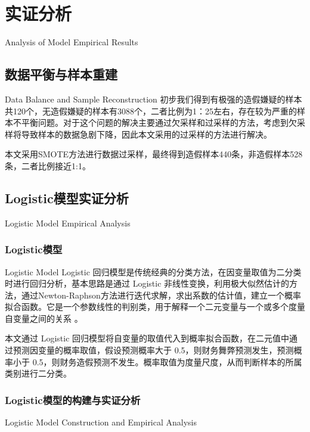 \chapter{实证分析}{Analysis of Model Empirical Results}



\section{数据平衡与样本重建}{Data Balance and Sample Reconstruction}
初步我们得到有极强的造假嫌疑的样本共120个，无造假嫌疑的样本有3088个，二者比例为1：25左右，存在较为严重的样本不平衡问题。对于这个问题的解决主要通过欠采样和过采样的方法，考虑到欠采样将导致样本的数据急剧下降，因此本文采用的过采样的方法进行解决。

本文采用SMOTE方法\cite{Chawla2011SMOTE}进行数据过采样，最终得到造假样本440条，非造假样本528条，二者比例接近1:1。

\section{Logistic模型实证分析}{Logistic Model Empirical Analysis}
\subsection{Logistic模型}{Logistic Model}
Logistic 回归模型是传统经典的分类方法，在因变量取值为二分类时进行回归分析，基本思路是通过 Logistic 非线性变换，利用极大似然估计的方法，通过Newton-Raphson方法进行迭代求解，求出系数的估计值，建立一个概率拟合函数。它是一个参数线性的判别类，用于解释一个二元变量与一个或多个度量自变量之间的关系 
\cite{agresti_introduction_2007}。


本文通过 Logistic 回归模型将自变量的取值代入到概率拟合函数，在二元值中通过预测因变量的概率取值，假设预测概率大于 0.5，则财务舞弊预测发生，预测概率小于 0.5，则财务造假预测不发生。概率取值为度量尺度，从而判断样本的所属类别进行二分类。

\subsection{Logistic模型的构建与实证分析}{Logistic Model Construction and Empirical Analysis}

